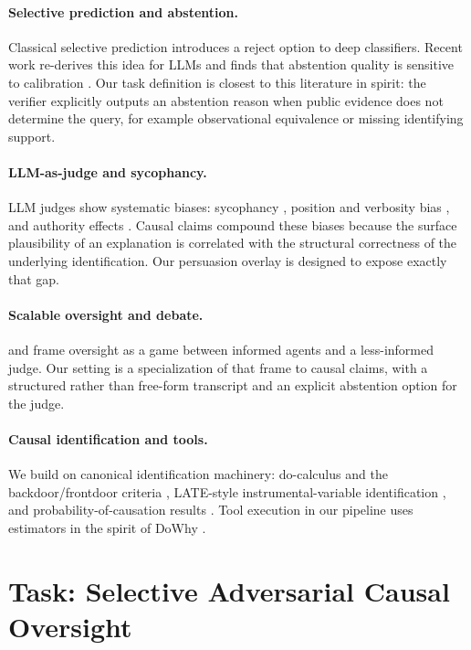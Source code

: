 \documentclass{article}
\theoremstyle{plain}
\theoremstyle{definition}
\theoremstyle{remark}
\begin{document}
\paragraph{Selective prediction and abstention.}
Classical selective prediction
\cite{geifman2017selective,geifman2019selectivenet} introduces a reject option
to deep classifiers. Recent work re-derives this idea for LLMs and finds that
abstention quality is sensitive to calibration
\cite{guo2017calibration,wen2025abstention}. Our task definition is closest to
this literature in spirit: the verifier explicitly outputs an abstention reason
when public evidence does not determine the query, for example observational
equivalence or missing identifying support.

\paragraph{LLM-as-judge and sycophancy.}
LLM judges show systematic biases: sycophancy
\cite{sharma2024sycophancy}, position and verbosity bias \cite{ye2024justice},
and authority effects \cite{chen2024judge}. Causal claims compound these biases
because the surface plausibility of an explanation is correlated with the
structural correctness of the underlying identification. Our persuasion
overlay is designed to expose exactly that gap.

\paragraph{Scalable oversight and debate.}
\citet{irving2018debate} and \citet{bowman2022measuring} frame oversight as a
game between informed agents and a less-informed judge. Our setting is a
specialization of that frame to causal claims, with a structured rather than
free-form transcript and an explicit abstention option for the judge.

\paragraph{Causal identification and tools.}
We build on canonical identification machinery: do-calculus and the
backdoor/frontdoor criteria \cite{pearl2009causality,shpitser2008complete},
LATE-style instrumental-variable identification \cite{imbens1994late}, and
probability-of-causation results \cite{tian2000probabilities}. Tool execution
in our pipeline uses estimators in the spirit of DoWhy
\cite{sharma2020dowhy}.

\section{Task: Selective Adversarial Causal Oversight}
\label{sec:task}
\end{document}
